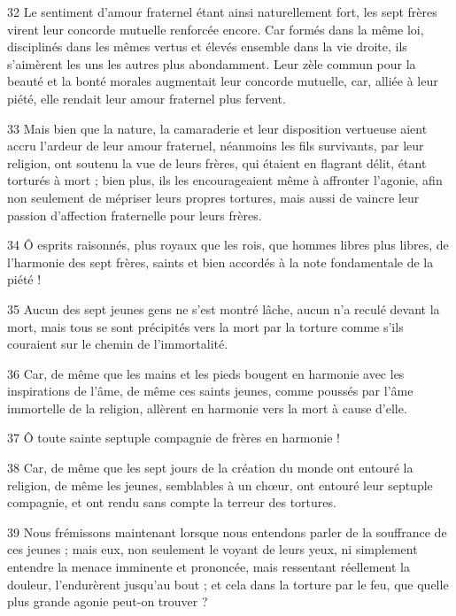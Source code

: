 \par 32 Le sentiment d'amour fraternel étant ainsi naturellement fort, les sept frères virent leur concorde mutuelle renforcée encore. Car formés dans la même loi, disciplinés dans les mêmes vertus et élevés ensemble dans la vie droite, ils s'aimèrent les uns les autres plus abondamment. Leur zèle commun pour la beauté et la bonté morales augmentait leur concorde mutuelle, car, alliée à leur piété, elle rendait leur amour fraternel plus fervent.

\par 33 Mais bien que la nature, la camaraderie et leur disposition vertueuse aient accru l'ardeur de leur amour fraternel, néanmoins les fils survivants, par leur religion, ont soutenu la vue de leurs frères, qui étaient en flagrant délit, étant torturés à mort ; bien plus, ils les encourageaient même à affronter l'agonie, afin non seulement de mépriser leurs propres tortures, mais aussi de vaincre leur passion d'affection fraternelle pour leurs frères.

\par 34 Ô esprits raisonnés, plus royaux que les rois, que hommes libres plus libres, de l'harmonie des sept frères, saints et bien accordés à la note fondamentale de la piété !

\par 35 Aucun des sept jeunes gens ne s'est montré lâche, aucun n'a reculé devant la mort, mais tous se sont précipités vers la mort par la torture comme s'ils couraient sur le chemin de l'immortalité.

\par 36 Car, de même que les mains et les pieds bougent en harmonie avec les inspirations de l'âme, de même ces saints jeunes, comme poussés par l'âme immortelle de la religion, allèrent en harmonie vers la mort à cause d'elle.

\par 37 Ô toute sainte septuple compagnie de frères en harmonie !

\par 38 Car, de même que les sept jours de la création du monde ont entouré la religion, de même les jeunes, semblables à un chœur, ont entouré leur septuple compagnie, et ont rendu sans compte la terreur des tortures.

\par 39 Nous frémissons maintenant lorsque nous entendons parler de la souffrance de ces jeunes ; mais eux, non seulement le voyant de leurs yeux, ni simplement entendre la menace imminente et prononcée, mais ressentant réellement la douleur, l'endurèrent jusqu'au bout ; et cela dans la torture par le feu, que quelle plus grande agonie peut-on trouver ?

